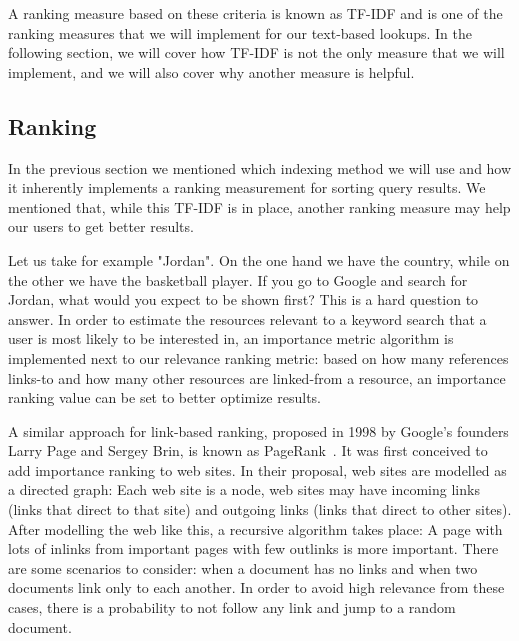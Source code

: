 A ranking measure based on these criteria is known as TF-IDF and is one of the ranking measures that we will implement for our text-based lookups. In the following section, we will cover how TF-IDF is not the only measure that we will implement, and we will also cover why another measure is helpful.


\subsection{Ranking}
\label{chap:pagerank}

In the previous section we mentioned which indexing method we will use and how it inherently implements a ranking measurement for sorting query results. We mentioned that, while this TF-IDF is in place, another ranking measure may help our users to get better results.

Let us take for example "Jordan". On the one hand we have the country, while on the other we have the basketball player. If you go to Google and search for Jordan, what would you expect to be shown first? This is a hard question to answer. In order to estimate the resources relevant to a keyword search that a user is most likely to be interested in, an importance metric algorithm is implemented next to our relevance ranking metric: based on how many references links-to and how many other resources are linked-from a resource, an importance ranking value can be set to better optimize results.

A similar approach for link-based ranking, proposed in 1998 by Google's founders Larry Page and Sergey Brin, is known as PageRank~\cite{Page1998}. It was first conceived to add importance ranking to web sites. In their proposal, web sites are modelled as a directed graph: Each web site is a node, web sites may have incoming links (links that direct to that site) and outgoing links (links that direct to other sites). After modelling the web like this, a recursive algorithm takes place: A page with lots of inlinks from important pages with few outlinks is more important. There are some scenarios to consider: when a document has no links and when two documents link only to each another. In order to avoid high relevance from these cases, there is a probability to not follow any link and jump to a random document.

